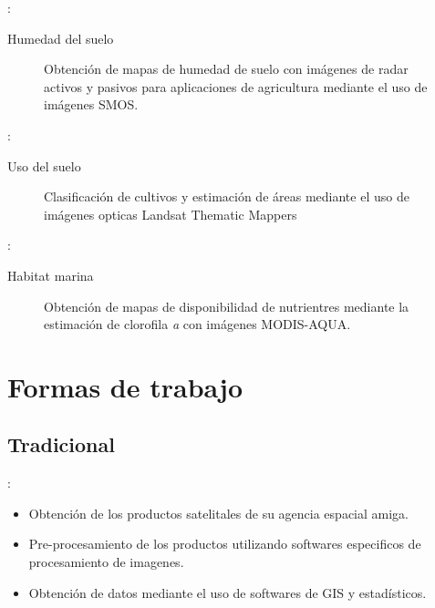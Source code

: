 \documentclass[]{beamer}
\begin{document}
\begin{frame}{\secname : \subsecname}
    \begin{exampleblock}{Humedad del suelo}
        \begin{figure}[h!]
            \centering
            \caption{Obtención de mapas de humedad de suelo con imágenes de radar activos y pasivos para aplicaciones de agricultura mediante el uso de imágenes SMOS.}
            \label{}
        \end{figure}
    \end{exampleblock}
\end{frame}

\begin{frame}{\secname : \subsecname}
    \begin{exampleblock}{Uso del suelo}
        \begin{figure}[h!]
            \centering
            \caption{Clasificación de cultivos y estimación de áreas mediante el uso de imágenes opticas Landsat Thematic Mappers}
            \label{}
        \end{figure}
    \end{exampleblock}
\end{frame}

\begin{frame}{\secname : \subsecname}
    \begin{exampleblock}{Habitat marina}
        \begin{figure}[h!]
            \centering
            \caption{Obtención de mapas de disponibilidad de nutrientres mediante la estimación de clorofila \emph{a} con imágenes MODIS-AQUA.}
            \label{}
        \end{figure}
    \end{exampleblock}
\end{frame}

\section{Formas de trabajo}
\subsection{Tradicional}
\begin{frame}{\secname : \subsecname}
    \begin{itemize}[<+->]
        \item Obtención de los productos satelitales de su agencia espacial amiga.
        \item Pre-procesamiento de los productos utilizando softwares especificos de procesamiento de imagenes.
        \item Obtención de datos mediante el uso de softwares de GIS y estadísticos.
    \end{itemize}
\end{frame}
\end{document}
